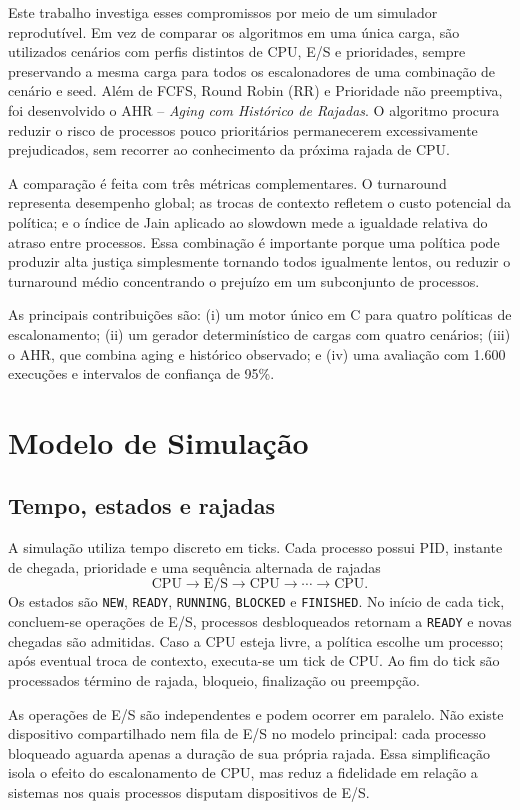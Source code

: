 \documentclass[conference]{IEEEtran}
\begin{document}
Este trabalho investiga esses compromissos por meio de um simulador reprodutível. Em vez de comparar os algoritmos em uma única carga, são utilizados cenários com perfis distintos de CPU, E/S e prioridades, sempre preservando a mesma carga para todos os escalonadores de uma combinação de cenário e seed. Além de FCFS, Round Robin (RR) e Prioridade não preemptiva, foi desenvolvido o AHR -- \textit{Aging com Histórico de Rajadas}. O algoritmo procura reduzir o risco de processos pouco prioritários permanecerem excessivamente prejudicados, sem recorrer ao conhecimento da próxima rajada de CPU.

A comparação é feita com três métricas complementares. O turnaround representa desempenho global; as trocas de contexto refletem o custo potencial da política; e o índice de Jain aplicado ao slowdown mede a igualdade relativa do atraso entre processos. Essa combinação é importante porque uma política pode produzir alta justiça simplesmente tornando todos igualmente lentos, ou reduzir o turnaround médio concentrando o prejuízo em um subconjunto de processos.

As principais contribuições são: (i) um motor único em C para quatro políticas de escalonamento; (ii) um gerador determinístico de cargas com quatro cenários; (iii) o AHR, que combina aging e histórico observado; e (iv) uma avaliação com 1.600 execuções e intervalos de confiança de 95\%.

\section{Modelo de Simulação}
\subsection{Tempo, estados e rajadas}
A simulação utiliza tempo discreto em ticks. Cada processo possui PID, instante de chegada, prioridade e uma sequência alternada de rajadas
\[
\mathrm{CPU}\rightarrow\mathrm{E/S}\rightarrow\mathrm{CPU}\rightarrow\cdots\rightarrow\mathrm{CPU}.
\]
Os estados são \texttt{NEW}, \texttt{READY}, \texttt{RUNNING}, \texttt{BLOCKED} e \texttt{FINISHED}. No início de cada tick, concluem-se operações de E/S, processos desbloqueados retornam a \texttt{READY} e novas chegadas são admitidas. Caso a CPU esteja livre, a política escolhe um processo; após eventual troca de contexto, executa-se um tick de CPU. Ao fim do tick são processados término de rajada, bloqueio, finalização ou preempção.

As operações de E/S são independentes e podem ocorrer em paralelo. Não existe dispositivo compartilhado nem fila de E/S no modelo principal: cada processo bloqueado aguarda apenas a duração de sua própria rajada. Essa simplificação isola o efeito do escalonamento de CPU, mas reduz a fidelidade em relação a sistemas nos quais processos disputam dispositivos de E/S.
\end{document}
